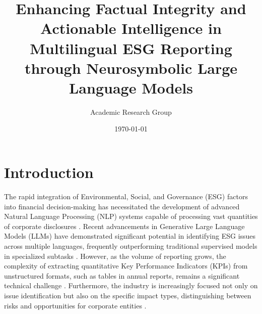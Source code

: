 \documentclass{article}
\title{Enhancing Factual Integrity and Actionable Intelligence in Multilingual ESG Reporting through Neurosymbolic Large Language Models}
\author{Academic Research Group}
\date{\today}
\begin{document}
\maketitle

\section{Introduction}
The rapid integration of Environmental, Social, and Governance (ESG) factors into financial decision-making has necessitated the development of advanced Natural Language Processing (NLP) systems capable of processing vast quantities of corporate disclosures \citep{Multi-Lingual ESG Issue Identification}. Recent advancements in Generative Large Language Models (LLMs) have demonstrated significant potential in identifying ESG issues across multiple languages, frequently outperforming traditional supervised models in specialized subtasks \citep{EaSyGuide : ESG Issue Identification Framework leveraging Abilities of Generative Large Language Models, Leveraging BERT Language Models for Multi-Lingual ESG Issue Identification}. However, as the volume of reporting grows, the complexity of extracting quantitative Key Performance Indicators (KPIs) from unstructured formats, such as tables in annual reports, remains a significant technical challenge \citep{Statements: Universal Information Extraction from Tables with Large Language Models for ESG KPIs}. Furthermore, the industry is increasingly focused not only on issue identification but also on the specific impact types, distinguishing between risks and opportunities for corporate entities \citep{Multi-Lingual ESG Impact Type Identification, ESG Impact Type Classification: Leveraging Strategic Prompt Engineering and LLM Fine-Tuning}.
\end{document}
